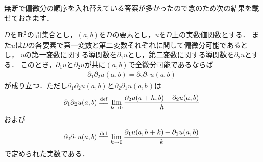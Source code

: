 	無断で偏微分の順序を入れ替えている答案が多かったので念のため次の結果を載せておきます．
	
	\begin{screen}
		\begin{thm}[偏導関数が全微分可能なら偏微分は順序を替えても等しい]
			$D$を$\mathbf{R}^2$の開集合とし，$(a,b)$を$D$の要素とし，$u$を$D$上の実数値関数とする．
			また$u$は$D$の各要素で第一変数と第二変数それぞれに関して偏微分可能であるとし，
			$u$の第一変数に関する導関数を$\partial_1 u$とし，第二変数に関する導関数を$\partial_2 u$とする．
			このとき，$\partial_1 u$と$\partial_2 u$が共に$(a,b)$で全微分可能であるならば
			\begin{align}
				\partial_1 \partial_2 u(a,b) = \partial_2 \partial_1 u(a,b)
			\end{align}
			が成り立つ．ただし$\partial_1 \partial_2 u(a,b)$と$\partial_2 \partial_1 u(a,b)$は
			\begin{align}
				\partial_1 \partial_2 u(a,b) \defeq \lim_{h \to 0} \frac{\partial_2 u(a+h,b) - \partial_2 u(a,b)}{h}
			\end{align}
			および
			\begin{align}
				\partial_2 \partial_1 u(a,b) \defeq \lim_{k \to 0} \frac{\partial_1 u(a,b+k) - \partial_1 u(a,b)}{k}
			\end{align}
			で定められた実数である．
		\end{thm}
	\end{screen}
	
